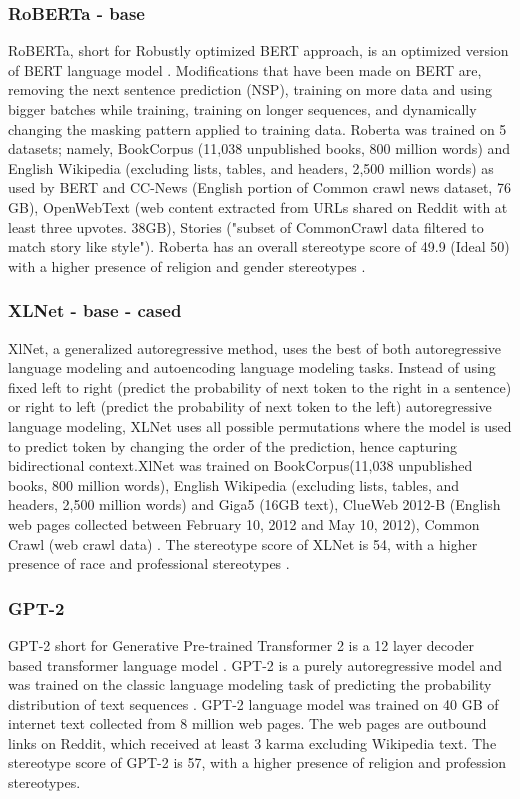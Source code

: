 \subsubsection{RoBERTa - base}
RoBERTa, short for Robustly optimized BERT approach, is an optimized version of BERT language model \cite{liu2019roberta}. Modifications that have been made on BERT are, removing the next sentence prediction (NSP), training on more data and using bigger batches while training, training on longer sequences, and dynamically changing the masking pattern applied to training data\cite{liu2019roberta}.  Roberta was trained on 5 datasets; namely, BookCorpus (11,038 unpublished books, 800 million words) and English Wikipedia (excluding lists, tables, and headers, 2,500 million words) as used by BERT and CC-News (English portion of Common crawl news dataset, 76 GB), OpenWebText (web content extracted from URLs shared on Reddit with at least three upvotes. 38GB), Stories ("subset of CommonCrawl data filtered to match story like style")\cite{liu2019roberta}. Roberta has an overall stereotype score of 49.9 (Ideal 50) with a higher presence of religion and gender stereotypes \cite{nadeem2020stereoset}.  

\subsubsection{XLNet - base - cased }
XlNet, a generalized autoregressive method, uses the best of both autoregressive language modeling and autoencoding language modeling tasks. Instead of using fixed left to right (predict the probability of next token to the right in a sentence) or right to left (predict the probability of next token to the left) autoregressive language modeling, XLNet uses all possible permutations where the model is used to predict token by changing the order of the prediction, hence capturing bidirectional context\cite{yang2019xlnet}.XlNet was trained on BookCorpus(11,038 unpublished books, 800 million words), English Wikipedia (excluding lists, tables, and headers, 2,500 million words) and  Giga5 (16GB text), ClueWeb 2012-B (English web pages collected between February 10, 2012 and May 10, 2012), Common Crawl (web crawl data) \cite{yang2019xlnet}. The stereotype score of XLNet is 54, with a higher presence of race and professional stereotypes \cite{nadeem2020stereoset}.
\subsubsection{GPT-2}
GPT-2 short for Generative Pre-trained Transformer 2 is a 12 layer decoder based transformer language model \cite{radford2019language}. GPT-2 is a purely autoregressive model and was trained on the classic language modeling task of predicting the probability distribution of text sequences \cite{radford2019language}. GPT-2 language model was trained on 40 GB of internet text collected from 8 million web pages. The web pages are outbound links on Reddit, which received at least 3 karma excluding Wikipedia text. The stereotype score of GPT-2 is 57, with a higher presence of religion and profession stereotypes. 


